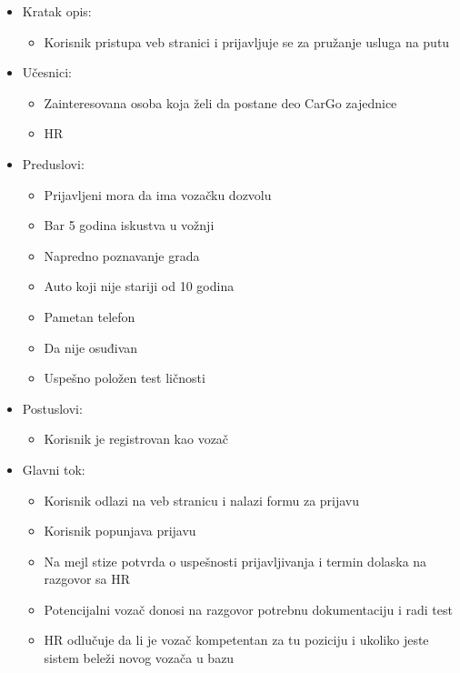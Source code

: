 \begin{itemize}
	\item Kratak opis:
		\begin{itemize}
			\item Korisnik pristupa veb stranici i prijavljuje se za pružanje usluga na putu
		\end{itemize}
 
	\item Učesnici:
		\begin{itemize}
			\item Zainteresovana osoba koja želi da postane deo CarGo zajednice
			\item HR
		\end{itemize}				

	\item Preduslovi:
		\begin{itemize}
		    \item Prijavljeni mora da ima vozačku dozvolu
		    \item Bar 5 godina iskustva u vožnji
		    \item Napredno poznavanje grada
		    \item Auto koji nije stariji od 10 godina
		    \item Pametan telefon
		    \item Da nije osuđivan
		    \item Uspešno položen test ličnosti
		\end{itemize}

	\item Postuslovi:
		\begin{itemize}
			\item Korisnik je registrovan kao vozač
		\end{itemize}		


	\item Glavni tok:
		\begin{itemize}
		    \item Korisnik odlazi na veb stranicu i nalazi formu za prijavu
		    \item Korisnik popunjava prijavu
		    \item Na mejl stize potvrda o uspešnosti prijavljivanja i termin dolaska na razgovor sa HR
		    \item Potencijalni vozač donosi na razgovor potrebnu dokumentaciju i radi test
		    \item HR odlučuje da li je vozač kompetentan za tu poziciju i ukoliko jeste sistem beleži novog vozača u bazu
		\end{itemize}


\end{itemize}
